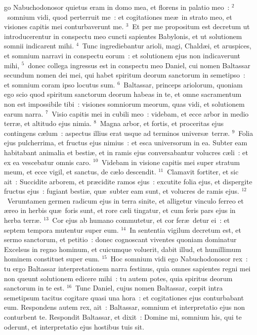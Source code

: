 \bchapter
{}go Nabuchodonosor quietus eram in domo mea, et florens in palatio meo~:
${}^{2}$~somnium vidi, quod perterruit me~: et cogitationes me\ae\ in strato meo, et visiones capitis mei conturbaverunt me.
${}^{3}$~Et per me propositum est decretum ut introducerentur in conspectu meo cuncti sapientes Babylonis, et ut solutionem somnii indicarent mihi.
${}^{4}$~Tunc ingrediebantur arioli, magi, Chald\ae i, et aruspices, et somnium narravi in conspectu eorum~: et solutionem ejus non indicaverunt mihi,
${}^{5}$~donec collega ingressus est in conspectu meo Daniel, cui nomen Baltassar secundum nomen dei mei, qui habet spiritum deorum sanctorum in semetipso~: et somnium coram ipso locutus sum.
${}^{6}$~Baltassar, princeps ariolorum, quoniam ego scio quod spiritum sanctorum deorum habeas in te, et omne sacramentum non est impossibile tibi~: visiones somniorum meorum, quas vidi, et solutionem earum narra.
${}^{7}$~Visio capitis mei in cubili meo~: videbam, et ecce arbor in medio terr\ae , et altitudo ejus nimia.
${}^{8}$~Magna arbor, et fortis, et proceritas ejus contingens c\ae lum~: aspectus illius erat usque ad terminos univers\ae\ terr\ae .
${}^{9}$~Folia ejus pulcherrima, et fructus ejus nimius~: et esca universorum in ea. Subter eam habitabant animalia et besti\ae , et in ramis ejus conversabantur volucres c\ae li~: et ex ea vescebatur omnis caro.
${}^{10}$~Videbam in visione capitis mei super stratum meum, et ecce vigil, et sanctus, de c\ae lo descendit.
${}^{11}$~Clamavit fortiter, et sic ait~: Succidite arborem, et pr\ae cidite ramos ejus~: excutite folia ejus, et dispergite fructus ejus~: fugiant besti\ae , qu\ae\ subter eam sunt, et volucres de ramis ejus.
${}^{12}$~Verumtamen germen radicum ejus in terra sinite, et alligetur vinculo ferreo et \ae reo in herbis qu\ae\ foris sunt, et rore c\ae li tingatur, et cum feris pars ejus in herba terr\ae .
${}^{13}$~Cor ejus ab humano commutetur, et cor fer\ae\ detur ei~: et septem tempora mutentur super eum.
${}^{14}$~In sententia vigilum decretum est, et sermo sanctorum, et petitio~: donec cognoscant viventes quoniam dominatur Excelsus in regno hominum, et cuicumque voluerit, dabit illud, et humillimum hominem constituet super eum.
${}^{15}$~Hoc somnium vidi ego Nabuchodonosor rex~: tu ergo Baltassar interpretationem narra festinus, quia omnes sapientes regni mei non queunt solutionem edicere mihi~: tu autem potes, quia spiritus deorum sanctorum in te est.
${}^{16}$~Tunc Daniel, cujus nomen Baltassar, cœpit intra semetipsum tacitus cogitare quasi una hora~: et cogitationes ejus conturbabant eum. Respondens autem rex, ait~: Baltassar, somnium et interpretatio ejus non conturbent te. Respondit Baltassar, et dixit~: Domine mi, somnium his, qui te oderunt, et interpretatio ejus hostibus tuis sit.

